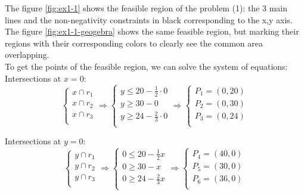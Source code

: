 \documentclass[unicode,11pt,a4paper,oneside,numbers=endperiod,openany]{scrartcl}
\begin{document}
The figure \ref{fig:ex1-1} shows the feasible region of the problem (1):
the 3 main lines and the non-negativity constraints in black corresponding to the x,y axis.
The figure \ref{fig:ex1-1-geogebra} shows the same feasible region,
but marking their regions with their corresponding colors to clearly see the common area overlapping.\\

To get the points of the feasible region, we can solve the system of equations:\\

Intersections at $x=0$:
\begin{equation*}
	\begin{cases}
		x \cap r_1 \\
		x \cap r_2 \\
		x \cap r_3 \\
	\end{cases}
	\Rightarrow
	\begin{cases}
		y \leq 20 - \frac{1}{2} \cdot 0 \\
		y \geq 30 - 0                   \\
		y \geq 24 - \frac{2}{3} \cdot 0 \\
	\end{cases}
	\Rightarrow
	\begin{cases}
		P_1 = (0, 20) \\
		P_2 = (0, 30) \\
		P_3 = (0, 24) \\
	\end{cases}
\end{equation*}

Intersections at $y=0$:
\begin{equation*}
	\begin{cases}
		y \cap r_1 \\
		y \cap r_2 \\
		y \cap r_3 \\
	\end{cases}
	\Rightarrow
	\begin{cases}
		0 \leq 20 - \frac{1}{2} x \\
		0 \geq 30 - x             \\
		0 \geq 24 - \frac{2}{3} x \\
	\end{cases}
	\Rightarrow
	\begin{cases}
		P_4 = (40, 0) \\
		P_5 = (30, 0) \\
		P_6 = (36, 0) \\
	\end{cases}
\end{equation*}
\end{document}
